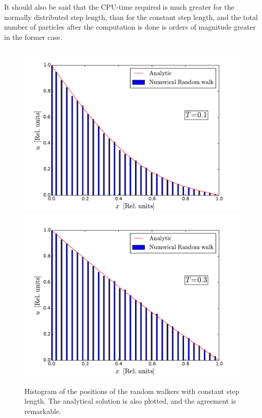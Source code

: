 \documentclass[twoside, 11pt]{article}
\begin{document}
		It should also be said that the CPU-time required is much greater for the normally distributed step length, than for the constant step length, and the total number of particles after the computation is done is orders of magnitude greater in the former case.
		\begin{figure}
			\centering
			\includegraphics[width=0.5\linewidth]{Figures/RandomWalk_constant_step_T01}%
			\includegraphics[width=0.5\linewidth]{Figures/RandomWalk_constant_step_T03}
			\caption{Histogram of the positions of the random walkers with constant step length. The analytical solution is also plotted, and the agreement is remarkable.}
			\label{fig: histogram random walkers constant step}
		\end{figure}
\end{document}
